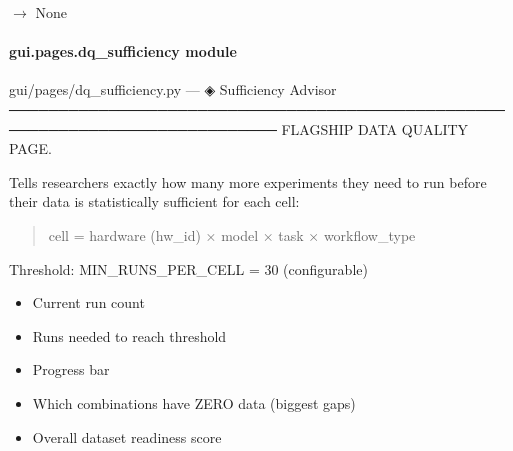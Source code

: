 \documentclass[letterpaper,10pt,english]{sphinxmanual}
\begin{document}
\begin{fulllineitems}
\label{\detokenize{gui.pages.dq_schema:gui.pages.dq_schema.render}}
\pysigstartsignatures
\pysiglinewithargsret
{}
{}
{{ $\rightarrow$ None}}
\pysigstopsignatures
\end{fulllineitems}


\sphinxstepscope


\paragraph{gui.pages.dq\_sufficiency module}
\label{\detokenize{gui.pages.dq_sufficiency:module-gui.pages.dq_sufficiency}}\label{\detokenize{gui.pages.dq_sufficiency:gui-pages-dq-sufficiency-module}}\label{\detokenize{gui.pages.dq_sufficiency::doc}}
\sphinxAtStartPar
gui/pages/dq\_sufficiency.py  —  ◈  Sufficiency Advisor
─────────────────────────────────────────────────────────────────────────────
FLAGSHIP DATA QUALITY PAGE.

\sphinxAtStartPar
Tells researchers exactly how many more experiments they need to run
before their data is statistically sufficient for each cell:
\begin{quote}

\sphinxAtStartPar
cell = hardware (hw\_id) × model × task × workflow\_type
\end{quote}

\sphinxAtStartPar
Threshold: MIN\_RUNS\_PER\_CELL = 30 (configurable)
\begin{description}
\begin{itemize}
\item {} 
\sphinxAtStartPar
Current run count

\item {} 
\sphinxAtStartPar
Runs needed to reach threshold

\item {} 
\sphinxAtStartPar
Progress bar

\item {} 
\sphinxAtStartPar
Which combinations have ZERO data (biggest gaps)

\item {} 
\sphinxAtStartPar
Overall dataset readiness score

\end{itemize}

\end{description}
\end{document}
